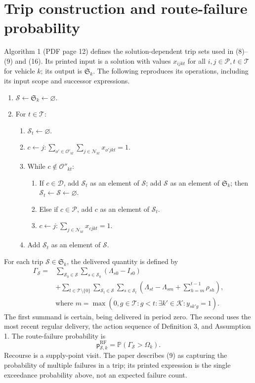 \documentclass[10pt]{article}
\begin{document}
\section*{Trip construction and route-failure probability}
Algorithm 1 (PDF page 12) defines the solution-dependent trip sets used in (8)--(9) and (16). Its printed input is a solution with values $x_{ijkt}$ for all $i,j\in\mathcal P,t\in\mathcal T$ for vehicle $k$; its output is $\mathfrak S_k$. The following reproduces its operations, including its input scope and successor expressions.
\begin{enumerate}
\item $\mathcal S\leftarrow\mathfrak S_k\leftarrow\varnothing$.
\item For $t\in\mathcal T$:
\begin{enumerate}
\item $\mathcal S_t\leftarrow\varnothing$.
\item $c\leftarrow j:\displaystyle\sum_{o'\in\mathcal O'_{kt}}\sum_{j\in\mathcal N_{kt}}x_{o'jkt}=1$.
\item While $c\notin\mathcal O''_{kt}$:
\begin{enumerate}
\item If $c\in\mathcal D$, add $\mathcal S_t$ as an element of $\mathcal S$; add $\mathcal S$ as an element of $\mathfrak S_k$; then $\mathcal S_t\leftarrow\mathcal S\leftarrow\varnothing$.
\item Else if $c\in\mathcal P$, add $c$ as an element of $\mathcal S_t$.
\item $c\leftarrow j:\displaystyle\sum_{j\in\mathcal N_{kt}}x_{cjkt}=1$.
\end{enumerate}
\item Add $\mathcal S_t$ as an element of $\mathcal S$.
\end{enumerate}
\end{enumerate}
For each trip $\mathcal S\in\mathfrak S_k$, the delivered quantity is defined by
\begin{equation}
\begin{aligned}
\Gamma_{\mathcal S}
={}&\sum_{\mathcal S_0\in\mathcal S}\sum_{s\in\mathcal S_0}(\Lambda_{s0}-I_{s0})\\
&+\sum_{t\in\mathcal T\setminus\{0\}}\sum_{\mathcal S_t\in\mathcal S}\sum_{s\in\mathcal S_t}
\left(\Lambda_{st}-\Lambda_{sm}+\sum_{h=m}^{t-1}\rho_{sh}\right),\\
&\text{where }m=\max(0,g\in\mathcal T:g<t:\exists k'\in\mathcal K:y_{sk'g}=1).
\end{aligned}\tag{8}
\end{equation}
The first summand is certain, being delivered in period zero. The second uses the most recent regular delivery, the action sequence of Definition 3, and Assumption 1. The route-failure probability is
\begin{equation}
\mathsf p^{\mathrm{RF}}_{\mathcal S,k}=\mathbb P(\Gamma_{\mathcal S}>\Omega_k).
\tag{9}
\end{equation}
Recourse is a supply-point visit. The paper describes (9) as capturing the probability of multiple failures in a trip; its printed expression is the single exceedance probability above, not an expected failure count.
\end{document}

